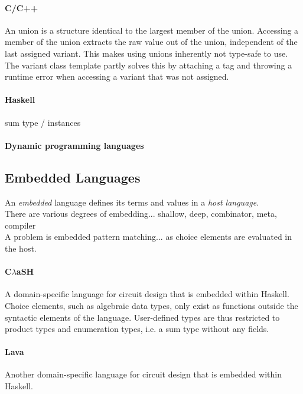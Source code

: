 \documentclass{article}
\begin{document}
\paragraph{C/C++}

An union is a structure identical to the largest member of the union.
Accessing a member of the union extracts the raw value out of the union, independent of the last assigned variant.
This makes using unions inherently not type-safe to use.
The variant class template partly solves this by attaching a tag and throwing a runtime error when accessing a variant that was not assigned.

\paragraph{Haskell}

sum type / instances

\paragraph{Dynamic programming languages}

\subsection{Embedded Languages}

An {\it embedded} language defines its terms and values in a {\it host language}.
\\
There are various degrees of embedding... shallow, deep, combinator, meta, compiler
\\
A problem is embedded pattern matching... as choice elements are evaluated in the host.

\paragraph{C$\lambda$aSH}

A domain-specific language for circuit design that is embedded within Haskell.
Choice elements, such as algebraic data types, only exist as functions outside the syntactic elements of the language.
User-defined types are thus restricted to product types and enumeration types, i.e. a sum type without any fields. \cite{clash}

\paragraph{Lava}

Another domain-specific language for circuit design that is embedded within Haskell.
\end{document}
